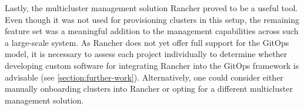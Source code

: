         Lastly, the multicluster management solution Rancher proved to be a useful tool. Even though it was not used for provisioning clusters in this setup, the remaining feature set was a meaningful addition to the management capabilities across such a large-scale system. As Rancher does not yet offer full support for the GitOps model, it is necessary to assess each project individually to determine whether developing custom software for integrating Rancher into the GitOps framework is advisable (see \autoref{section:further-work}). Alternatively, one could consider either manually onboarding clusters into Rancher or opting for a different multicluster management solution.

